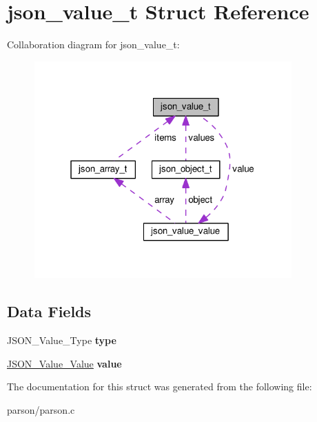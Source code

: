\hypertarget{structjson__value__t}{\section{json\-\_\-value\-\_\-t Struct Reference}
\label{structjson__value__t}
}


Collaboration diagram for json\-\_\-value\-\_\-t\-:\nopagebreak
\begin{figure}[H]
\begin{center}
\leavevmode
\includegraphics[width=280pt]{structjson__value__t__coll__graph}
\end{center}
\end{figure}
\subsection*{Data Fields}
\begin{DoxyCompactItemize}
\item 
\hypertarget{structjson__value__t_a374a05c01497eb7769eec2ab26cd95b6}{J\-S\-O\-N\-\_\-\-Value\-\_\-\-Type {\bfseries type}}\label{structjson__value__t_a374a05c01497eb7769eec2ab26cd95b6}

\item 
\hypertarget{structjson__value__t_a96135d87b37e477357e5d43811aaa3f1}{\hyperlink{unionjson__value__value}{J\-S\-O\-N\-\_\-\-Value\-\_\-\-Value} {\bfseries value}}\label{structjson__value__t_a96135d87b37e477357e5d43811aaa3f1}

\end{DoxyCompactItemize}


The documentation for this struct was generated from the following file\-:\begin{DoxyCompactItemize}
\item 
parson/parson.\-c\end{DoxyCompactItemize}
